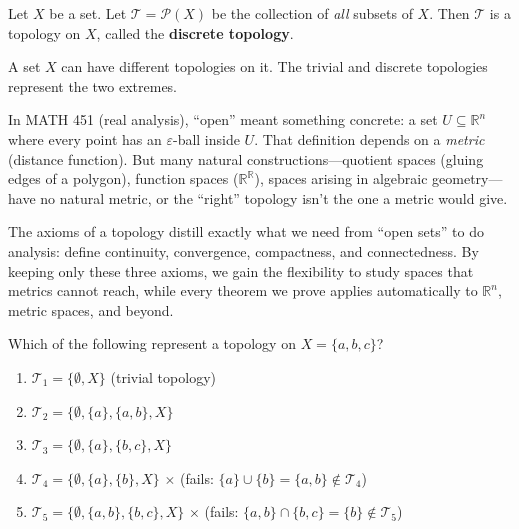 \documentclass[11pt]{report}
\begin{document}
\begin{exbox}
Let $X$ be a set. Let $\mathcal{T} = \mathcal{P}(X)$ be the collection of \emph{all} subsets of $X$. Then $\mathcal{T}$ is a topology on $X$, called the \textbf{discrete topology}.
\end{exbox}

\begin{rembox}
A set $X$ can have different topologies on it. The trivial and discrete topologies represent the two extremes.
\end{rembox}

\begin{rembox}
In MATH 451 (real analysis), ``open'' meant something concrete: a set $U \subseteq \mathbb{R}^n$ where every point has an $\varepsilon$-ball inside $U$. That definition depends on a \emph{metric} (distance function). But many natural constructions---quotient spaces (gluing edges of a polygon), function spaces ($\mathbb{R}^\mathbb{R}$), spaces arising in algebraic geometry---have no natural metric, or the ``right'' topology isn't the one a metric would give.

The axioms of a topology distill exactly what we need from ``open sets'' to do analysis: define continuity, convergence, compactness, and connectedness. By keeping only these three axioms, we gain the flexibility to study spaces that metrics cannot reach, while every theorem we prove applies automatically to $\mathbb{R}^n$, metric spaces, and beyond.
\end{rembox}

\begin{exbox}
Which of the following represent a topology on $X = \{a, b, c\}$?
\begin{enumerate}
    \item $\mathcal{T}_1 = \{\emptyset, X\}$ \checkmark \quad (trivial topology)
    \item $\mathcal{T}_2 = \{\emptyset, \{a\}, \{a,b\}, X\}$ \checkmark
    \item $\mathcal{T}_3 = \{\emptyset, \{a\}, \{b,c\}, X\}$ \checkmark
    \item $\mathcal{T}_4 = \{\emptyset, \{a\}, \{b\}, X\}$ \quad $\times$ \quad (fails: $\{a\} \cup \{b\} = \{a,b\} \notin \mathcal{T}_4$)
    \item $\mathcal{T}_5 = \{\emptyset, \{a,b\}, \{b,c\}, X\}$ \quad $\times$ \quad (fails: $\{a,b\} \cap \{b,c\} = \{b\} \notin \mathcal{T}_5$)
\end{enumerate}
\end{exbox}
\end{document}
